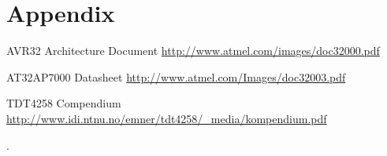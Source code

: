 \documentclass[a4paper,11pt]{article}
\begin{document}
\section{Appendix}

\footnotesize{  %
\begin{thebibliography}{N}

 AVR32 Architecture Document
\url{http://www.atmel.com/images/doc32000.pdf}

 AT32AP7000 Datasheet
\url{http://www.atmel.com/Images/doc32003.pdf}

 TDT4258 Compendium
\url{http://www.idi.ntnu.no/emner/tdt4258/_media/kompendium.pdf}

\end{thebibliography}.  
}
\end{document}
